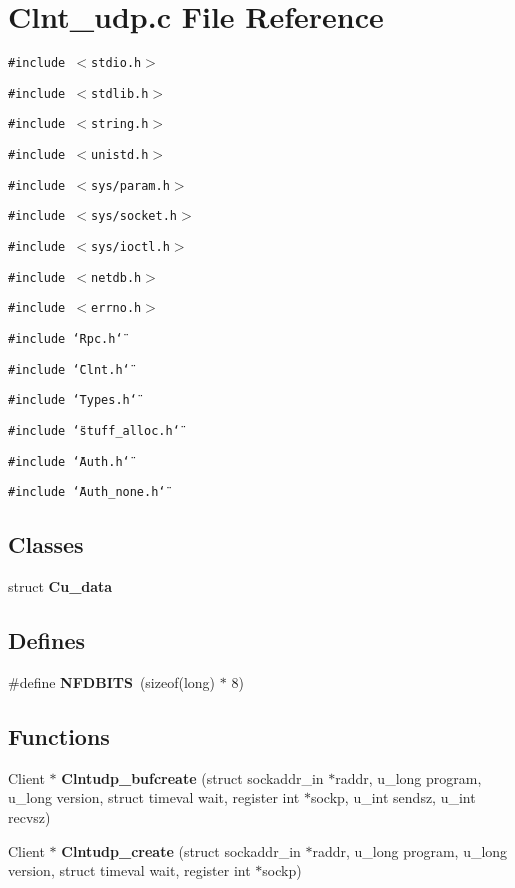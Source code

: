 \section{Clnt\_\-udp.c File Reference}
\label{Clnt__udp_8c}
{\tt \#include $<$stdio.h$>$}\par
{\tt \#include $<$stdlib.h$>$}\par
{\tt \#include $<$string.h$>$}\par
{\tt \#include $<$unistd.h$>$}\par
{\tt \#include $<$sys/param.h$>$}\par
{\tt \#include $<$sys/socket.h$>$}\par
{\tt \#include $<$sys/ioctl.h$>$}\par
{\tt \#include $<$netdb.h$>$}\par
{\tt \#include $<$errno.h$>$}\par
{\tt \#include \char`\"{}Rpc.h\char`\"{}}\par
{\tt \#include \char`\"{}Clnt.h\char`\"{}}\par
{\tt \#include \char`\"{}Types.h\char`\"{}}\par
{\tt \#include \char`\"{}stuff\_\-alloc.h\char`\"{}}\par
{\tt \#include \char`\"{}Auth.h\char`\"{}}\par
{\tt \#include \char`\"{}Auth\_\-none.h\char`\"{}}\par
\subsection*{Classes}
\begin{CompactItemize}
\item 
struct {\bf Cu\_\-data}
\end{CompactItemize}
\subsection*{Defines}
\begin{CompactItemize}
\item 
\#define {\bf NFDBITS}\ (sizeof(long) $\ast$ 8)
\end{CompactItemize}
\subsection*{Functions}
\begin{CompactItemize}
\item 
Client $\ast$ {\bf Clntudp\_\-bufcreate} (struct sockaddr\_\-in $\ast$raddr, u\_\-long program, u\_\-long version, struct timeval wait, register int $\ast$sockp, u\_\-int sendsz, u\_\-int recvsz)
\item 
Client $\ast$ {\bf Clntudp\_\-create} (struct sockaddr\_\-in $\ast$raddr, u\_\-long program, u\_\-long version, struct timeval wait, register int $\ast$sockp)
\end{CompactItemize}


